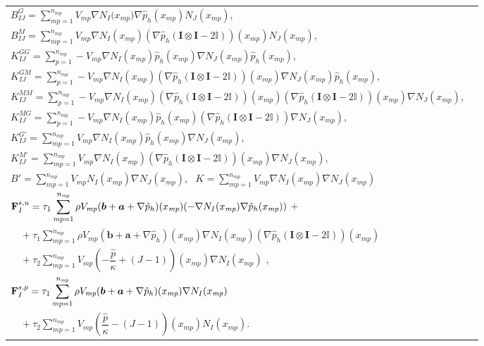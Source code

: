 \documentclass[11pt,english]{article}
\def\Identity{\mathbf{I}}
\def\mp{\textit{mp}}
\begin{document}
\begin{tabular}{ll}
    $B^G_{IJ}=\displaystyle\sum^{n_{\mp}}_{\mp=1} V_{\mp}  \nabla N_I({x_{\mp}) \nabla \hat{p}_h(x_{\mp})} N_J(x_{\mp})  $,\\
    $B^M_{IJ}=\displaystyle\sum^{n_{\mp}}_{\mp=1} V_{\mp}  \nabla N_I(x_{\mp}) (\nabla\hat{p}_h\left( \Identity \otimes \Identity -2\mathbb{I}\right) )(x_{\mp}) N_J(x_{\mp})  $, \\ 
    $K^{GG}_{IJ}=\displaystyle \sum^{n_{\mp}}_{p=1}  - V_{\mp} \nabla N_I ({x_{\mp}}) \hat{p}_h(x_{\mp})  \nabla N_J (x_{\mp}) \hat{p}_h(x_{\mp})$,\\
    $K^{GM}_{IJ}=\displaystyle \sum^{n_{\mp}}_{p=1}  - V_{\mp}  \nabla N_I (x_{\mp}) (\nabla\hat{p}_h\left( \Identity \otimes \Identity -2\mathbb{I}\right))(x_{\mp}) \nabla N_J ({x_{\mp}}) \hat{p}_h(x_{\mp}) $,
    \\
     $K^{MM}_{IJ}=\displaystyle \sum^{n_{\mp}}_{p=1}  - V_{\mp} \nabla N_I (x_{\mp}) (\nabla\hat{p}_h\left( \Identity \otimes \Identity -2\mathbb{I}\right) )(x_{\mp}) (\nabla\hat{p}_h\left( \Identity \otimes \Identity -2\mathbb{I}\right) )(x_{\mp}) \nabla N_J ({x_{\mp}})   $,
     \\
      $K^{MG}_{IJ}=\displaystyle \sum^{n_{\mp}}_{p=1}  - V_{\mp}  \nabla N_I (x_{\mp}) \hat{p}_h(x_{\mp}) (\nabla\hat{p}_h\left( \Identity \otimes \Identity -2\mathbb{I}\right) ) \nabla N_J ({x_{\mp}})   $,
      \\
    $K^{G'}_{IJ}= \displaystyle\sum^{n_{\mp}}_{\mp=1}  V_{\mp} \nabla  N_I (x_{\mp}) \hat{p}_h(x_{\mp}) \nabla N_J (x_{\mp})$,  
        \\
    $K^{M'}_{IJ}= \displaystyle\sum^{n_{\mp}}_{\mp=1}  V_{\mp} \nabla  N_I (x_{\mp}) (\nabla\hat{p}_h\left( \Identity \otimes \Identity -2\mathbb{I}\right) )(x_{\mp})\nabla N_J (x_{\mp})$,  
    \\ 
    $B'=\displaystyle\sum^{n_{\mp}}_{\mp=1}  V_{\mp}   N_I (x_{\mp}) \nabla N_J (x_{\mp})$, \ $K = \displaystyle\sum^{n_{\mp}}_{\mp=1}  V_{\mp} \nabla  N_I (x_{\mp}) \nabla  N_J (x_{\mp})$
    \\
    $\boldsymbol{\rm{F}}^{s,u}_{I}=\tau_1 \displaystyle\sum^{n_{\mp}}_{\mp=1}   \rho V_{\mp}  (\boldsymbol{b} +\boldsymbol{a} +\nabla \hat{p}_h)(x_{\mp})  (-\nabla N_I (x_{\mp}) \nabla \hat{p}_h(x_{\mp}))$ + \\
    $ \quad + \tau_1 \displaystyle\sum^{n_{\mp}}_{\mp=1}   \rho V_{\mp}  (\boldsymbol{b} +\boldsymbol{a} +\nabla \hat{p}_h)(x_{\mp}) \nabla N_I(x_{\mp}) (\nabla\hat{p}_h\left( \Identity \otimes \Identity -2\mathbb{I}\right) )(x_{\mp}) $\\
    $\quad + \tau_2 \displaystyle\sum^{n_{\mp}}_{\mp=1} V_{\mp} \left(-\dfrac{\hat{p}}{\kappa} +(J-1)\right) (x_{\mp}) \nabla N_I(x_{\mp})$ , 
    \\ 
    $\boldsymbol{\rm{F}}^{s,p}_{I}=\displaystyle
    \tau_1 \sum^{n_{\mp}}_{\mp=1} \rho V_{\mp}  (\boldsymbol{b} +\boldsymbol{a} +\nabla \hat{p}_h)(x_{\mp}) \nabla N_I(x_{\mp})$\\ 
    $\quad + \tau_2
    \sum^{n_{\mp}}_{\mp=1} V_{\mp} \left(\dfrac{\hat{p}}{\kappa} -(J-1)\right) (x_{\mp}) N_I(x_{\mp})$.
    \\ 
\end{tabular}\\
\end{document}
